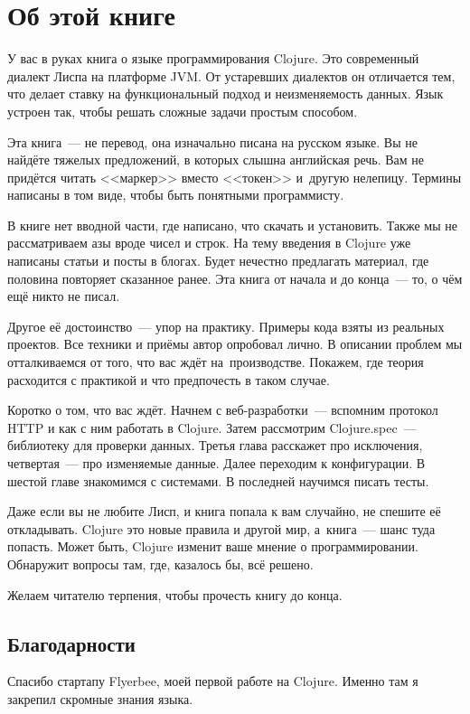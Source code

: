 \chapter*{Об этой книге}

У вас в руках книга о языке программирования Clojure. Это современный диалект
Лиспа на платформе JVM. От устаревших диалектов он отличается тем, что делает
ставку на функциональный подход и неизменяемость данных. Язык устроен так, чтобы
решать сложные задачи простым способом.

Эта книга~--- не перевод, она изначально писана на русском языке. Вы не найдёте
тяжелых предложений, в которых слышна английская речь. Вам не придётся читать
<<маркер>> вместо <<токен>> и~другую нелепицу. Термины написаны в том виде,
чтобы быть понятными программисту.

В книге нет вводной части, где написано, что скачать и установить. Также мы не
рассматриваем азы вроде чисел и строк. На тему введения в Clojure уже написаны
статьи и посты в блогах. Будет нечестно предлагать материал, где половина
повторяет сказанное ранее. Эта книга от начала и до конца~--- то, о чём ещё
никто не писал.

Другое её достоинство~--- упор на практику. Примеры кода взяты из реальных
проектов. Все техники и приёмы автор опробовал лично. В описании проблем мы
отталкиваемся от того, что вас ждёт на~производстве. Покажем, где теория
расходится с практикой и что предпочесть в таком случае.

Коротко о том, что вас ждёт. Начнем с веб-разработки~--- вспомним протокол HTTP
и как с ним работать в Clojure. Затем рассмотрим Clojure.spec~--- библиотеку для
проверки данных. Третья глава расскажет про исключения, четвертая~--- про
изменяемые данные. Далее переходим к конфигурации. В шестой главе знакомимся с
системами. В последней научимся писать тесты.

Даже если вы не любите Лисп, и книга попала к вам случайно, не спешите её
откладывать. Clojure это новые правила и другой мир, а~книга~--- шанс туда
попасть. Может быть, Clojure изменит ваше мнение о программировании. Обнаружит
вопросы там, где, казалось бы, всё решено.

Желаем читателю терпения, чтобы прочесть книгу до конца.

\section*{Благодарности}

Спасибо стартапу Flyerbee, моей первой работе на Clojure. Именно там я закрепил
скромные знания языка.

